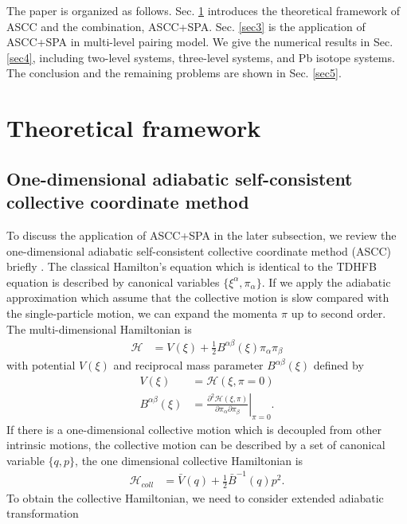 \documentclass[%
superscriptaddress,
showpacs,
nofootinbib,
amsmath,amssymb,
aps,
prc,
twocolumn,
floatfix ]%
{revtex4-1}
\begin{document}
The paper is organized as follows. Sec. \ref{sec2} introduces the theoretical framework of ASCC and the combination, ASCC+SPA. Sec. \ref{sec3} is the application of ASCC+SPA in multi-level pairing model. We give the numerical results in Sec. \ref{sec4}, including two-level systems, three-level systems, and Pb isotope systems. The conclusion and the remaining problems are shown in Sec. \ref{sec5}.


\section{Theoretical framework}
\label{sec2}

\subsection{One-dimensional adiabatic self-consistent collective coordinate method}
\label{ASCC}
To discuss the application of ASCC+SPA in the later subsection, we review the one-dimensional adiabatic self-consistent collective coordinate method (ASCC) briefly \cite{N2012}. The classical Hamilton's equation which is identical to the TDHFB equation is described by canonical variables $\{\xi^{\alpha},\pi_{\alpha}\}$. If we apply the adiabatic approximation which assume that the collective motion is slow compared with the single-particle motion, we can  expand the momenta $\pi$ up to second order. The multi-dimensional Hamiltonian is
\begin{align}
  \mathcal{H} &= V(\xi) + \frac{1}{2}B^{\alpha\beta}(\xi)\pi_{\alpha}\pi_{\beta}
\end{align}
with potential $V(\xi)$ and reciprocal mass parameter $B^{\alpha\beta}(\xi)$ defined by
\begin{align}
  V(\xi) &= \mathcal{H}(\xi,\pi=0) \\
  B^{\alpha\beta}(\xi) &= \left. \frac{\partial^2\mathcal{H}(\xi,\pi)}{\partial\pi_{\alpha}\partial\pi_{\beta}} \right|_{\pi=0}.
\end{align}
 If there is a one-dimensional collective motion which is decoupled from other intrinsic motions, the collective motion can be described by a set of canonical variable $\{q,p\}$, the one dimensional collective Hamiltonian is
\begin{align}
  \mathcal{H}_{coll} &= \bar{V}(q) + \frac{1}{2}\bar{B}^{-1}(q)p^2.
  \label{coll}
\end{align}
To obtain the collective Hamiltonian, we need to consider extended adiabatic transformation
\end{document}
